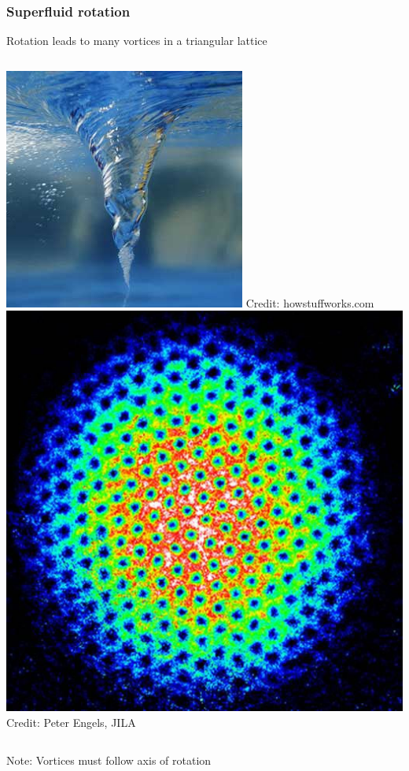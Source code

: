 \documentclass{beamer}
\begin{document}
\begin{frame}
\frametitle{Superfluid rotation}
\center Rotation leads to many vortices in a triangular lattice
\vspace{0.25cm}

\begin{columns}
\includegraphics[width=\textwidth]{vortex.jpg}
\tiny{Credit: howstuffworks.com}
\center{\huge $\rightarrow$}
\includegraphics[width=\textwidth]{vortexlattice.jpg}
\tiny{Credit: Peter Engels, JILA}
\end{columns}

\pause
\vspace{0.25cm}
Note: Vortices must follow axis of rotation
\end{frame}
\end{document}
